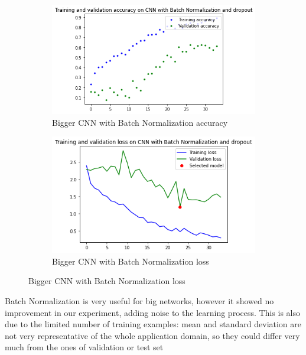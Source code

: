 \medskip


\begin{figure}[H]
	\begin{subfigure}{0.5\textwidth}
		\includegraphics[width=0.9\linewidth]{img/scratch/batch_normalization_acc.png} 
		\caption{Bigger CNN with Batch Normalization accuracy}
		\label{fig:BatchNormalizationacc}
	\end{subfigure}
	\begin{subfigure}{0.5\textwidth}
		\includegraphics[width=0.9\linewidth]{img/scratch/batch_normalization_loss.png}
		\caption{Bigger CNN with Batch Normalization loss}
		\label{fig:BatchNormalizationloss}
	\end{subfigure}
\end{figure}

\medskip

\noindent Batch Normalization is very useful for big networks, however it showed no improvement in our experiment, adding noise to the learning process. This is also due to the limited number of training examples: mean and standard deviation are not very representative of the whole application domain, so they could differ very much from the ones of validation or test set


